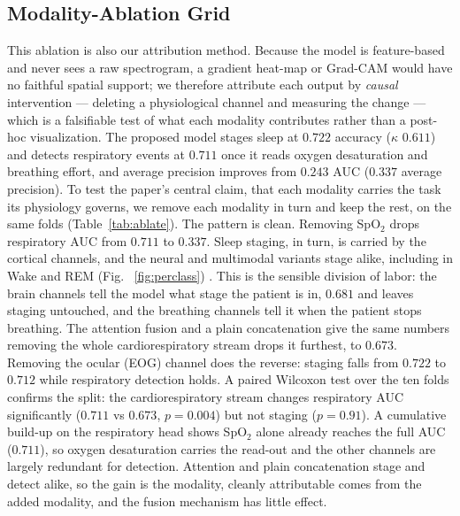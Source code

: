 \documentclass[preprint,12pt]{elsarticle}
\newcommand{\mmAcc}{0.722}
\newcommand{\mmK}{0.611}
\newcommand{\mmAuc}{0.711}
\newcommand{\mmAp}{0.337}
\newcommand{\eegAuc}{0.673}
\providecommand{\DIFaddtex}[1]{{\protect\color{blue} \sf #1}} %
\providecommand{\DIFdeltex}[1]{{\protect\color{red} \scriptsize #1}} %
\providecommand{\DIFaddbegin}{} %
\providecommand{\DIFaddend}{} %
\providecommand{\DIFdelbegin}{} %
\providecommand{\DIFdelend}{} %
\providecommand{\DIFadd}[1]{\texorpdfstring{\DIFaddtex{#1}}{#1}} %
\providecommand{\DIFdel}[1]{\texorpdfstring{\DIFdeltex{#1}}{}} %
\providecommand{\DIFscaledelfig}{0.5}
\newlength{\DIFdelgraphicswidth} %
\newlength{\DIFdelgraphicsheight} %
\providecommand{\DIFaddincludegraphics}[2][]{{\color{blue}\fbox{\DIFOincludegraphics[#1]{#2}}}} %
\providecommand{\DIFdelincludegraphics}[2][]{%
\sbox{\DIFdelgraphicsbox}{\DIFOincludegraphics[#1]{#2}}%
\settoboxwidth{\DIFdelgraphicswidth}{\DIFdelgraphicsbox} %
\settoboxtotalheight{\DIFdelgraphicsheight}{\DIFdelgraphicsbox} %
\scalebox{\DIFscaledelfig}{%
\parbox[b]{\DIFdelgraphicswidth}{\usebox{\DIFdelgraphicsbox}\\[-\baselineskip] \rule{\DIFdelgraphicswidth}{0em}}\llap{\resizebox{\DIFdelgraphicswidth}{\DIFdelgraphicsheight}{%
\setlength{\unitlength}{\DIFdelgraphicswidth}%
\begin{picture}(1,1)%
\thicklines\linethickness{2pt} %
{\color[rgb]{1,0,0}\put(0,0){\framebox(1,1){}}}%
{\color[rgb]{1,0,0}\put(0,0){\line( 1,1){1}}}%
{\color[rgb]{1,0,0}\put(0,1){\line(1,-1){1}}}%
\end{picture}%
}\hspace*{3pt}}} %
} %
\DeclareRobustCommand{\DIFaddbegin}{\DIFOaddbegin \let\includegraphics\DIFaddincludegraphics} %
\DeclareRobustCommand{\DIFaddend}{\DIFOaddend \let\includegraphics\DIFOincludegraphics} %
\DeclareRobustCommand{\DIFdelbegin}{\DIFOdelbegin \let\includegraphics\DIFdelincludegraphics} %
\DeclareRobustCommand{\DIFdelend}{\DIFOaddend \let\includegraphics\DIFOincludegraphics} %
\begin{document}
\subsection{\DIFadd{Modality-Ablation Grid}}
\label{sec:ablate}
\DIFadd{This ablation is also our attribution method. Because the model is feature-based and never sees
a raw spectrogram, a gradient heat-map or Grad-CAM would have no faithful spatial support; we
therefore attribute each output by \emph{causal} intervention --- deleting a physiological
channel and measuring the change --- which is a falsifiable test of what each modality
contributes rather than a post-hoc visualization.
The proposed model stages sleep at $\mmAcc$ accuracy ($\kappa$ $\mmK$) and detects respiratory
events at }\DIFaddend $\mmAuc$ \DIFdelbegin \DIFdel{once it reads
oxygen desaturation and breathing effort, and average precision improves from $0.243$ }\DIFdelend \DIFaddbegin \DIFadd{AUC ($\mmAp$ average precision). To test the paper's central claim, that each
modality carries the task its physiology governs, we remove each modality in turn and keep the
rest, on the same folds (Table~\ref{tab:ablate}). The pattern is clean. Removing SpO$_2$ drops
respiratory AUC from $\mmAuc$ }\DIFaddend to \DIFdelbegin \DIFdel{$\mmAp$. Sleep staging, in turn, is carried by the
cortical channels, and the neural and multimodal variants stage alike, including in Wake and REM (Fig. ~\ref{fig:perclass}) . This is
the sensible division of labor: the brain channels tell the model what stage the patient is in, }\DIFdelend \DIFaddbegin \DIFadd{$0.681$ and leaves staging untouched, }\DIFaddend and \DIFdelbegin \DIFdel{the breathing channels tell it when the patient stops breathing. The attention fusion and a
plain concatenation give the same numbers}\DIFdelend \DIFaddbegin \DIFadd{removing the whole
cardiorespiratory stream drops it furthest, to $\eegAuc$. Removing the ocular (EOG) channel does
the reverse: staging falls from $\mmAcc$ to $0.712$ while respiratory detection holds. A paired
Wilcoxon test over the ten folds confirms the split: the cardiorespiratory stream changes
respiratory AUC significantly ($0.711$ vs $\eegAuc$}\DIFaddend , \DIFaddbegin \DIFadd{$p=0.004$) but not staging ($p=0.91$). A
cumulative build-up on the respiratory head shows SpO$_2$ alone already reaches the full AUC
($0.711$), so oxygen desaturation carries the read-out and the other channels are largely
redundant for detection. Attention and plain concatenation stage and detect alike, }\DIFaddend so the gain
\DIFdelbegin \DIFdel{is the modality, cleanly attributable}\DIFdelend \DIFaddbegin \DIFadd{comes from the added modality, and the fusion mechanism has little effect}\DIFaddend .
\end{document}
